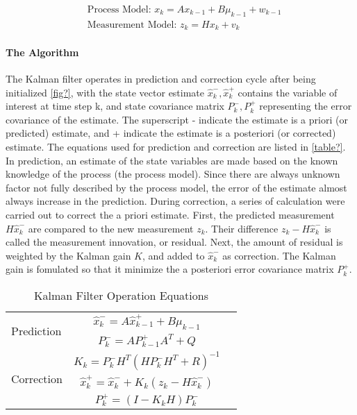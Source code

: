 \begin{align}
&\text{Process Model: }x_k = Ax_{k-1}+B\mu_{k-1}+w_{k-1}\\
&\text{Measurement Model: }z_k = Hx_k+v_k
\end{align}

\paragraph{The Algorithm}
The Kalman filter operates in prediction and correction cycle after
being initialized \ref{fig?}, with the state vector estimate
$\hat{x}^-_k, \hat{x}^+_k$ contains the variable of interest at time
step k, and state covariance matrix $P^-_k, P^+_k$ representing the
error covariance of the estimate. The superscript - indicate the
estimate is a priori (or predicted) estimate, and + indicate the
estimate is a posteriori (or corrected) estimate. The equations used
for prediction and correction are listed in \ref{table?}. In
prediction, an estimate of the state variables are made based on the
known knowledge of the process (the process model). Since there are
always unknown factor not fully described by the process model, the
error of the estimate almost always increase in the prediction. During
correction, a series of calculation were carried out to correct the a
priori estimate. First, the predicted measurement $H\hat{x}^-_k$ are
compared to the new measurement $z_k$. Their difference $z_k -
H\hat{x}^-_k$ is called the measurement innovation, or residual. Next,
the amount of residual is weighted by the Kalman gain $K$, and added
to $\hat{x}^-_k$ as correction. The Kalman gain is fomulated so that
it minimize the a posteriori error covariance matrix $P^+_k$. 

\begin{table}
\caption{Kalman Filter Operation Equations}
\label{tab:KF}
\centering
\begin{tabular}{|l|c r|}
\hline
\multirow{2}{*}{Prediction} 
& $\hat{x}^-_k=A\hat{x}^+_{k-1}+B\mu_{k-1}$ & \stepcounter{equation}\tetab{\theequation}\\
& $P^-_k = AP^+_{k-1}A^T+Q$ & \stepcounter{equation}\tetab{\theequation}\\
\hline
\multirow{3}{*}{Correction}
& $K_k=P^-_kH^T(HP^-_kH^T+R)^{-1}$  & \stepcounter{equation}\tetab{\theequation}\\
& $\hat{x}^+_k = \hat{x}^-_k+K_k(z_k-H\hat{x}^-_k)$ & \stepcounter{equation}\tetab{\theequation}\\
& $P^+_k = (I-K_kH)P^-_k$ & \stepcounter{equation}\tetab{\theequation}\\
\hline
\end{tabular}
\end{table}
